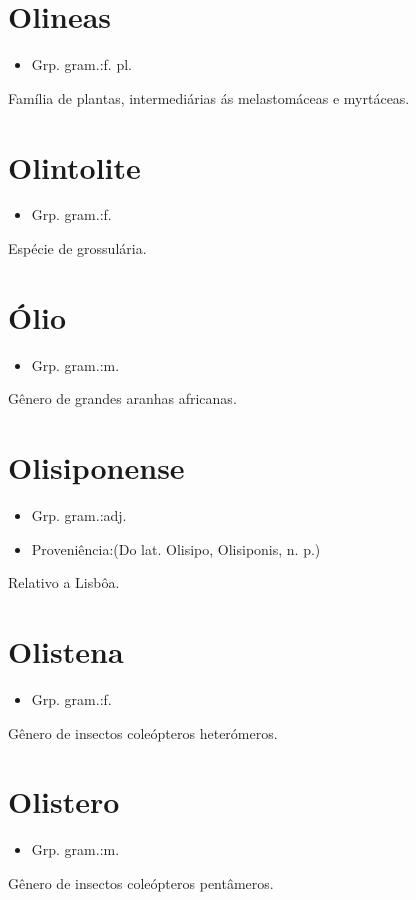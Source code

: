 \section{Olineas}
\begin{itemize}
\item {Grp. gram.:f. pl.}
\end{itemize}
Família de plantas, intermediárias ás melastomáceas e myrtáceas.
\section{Olintolite}
\begin{itemize}
\item {Grp. gram.:f.}
\end{itemize}
Espécie de grossulária.
\section{Ólio}
\begin{itemize}
\item {Grp. gram.:m.}
\end{itemize}
Gênero de grandes aranhas africanas.
\section{Olisiponense}
\begin{itemize}
\item {Grp. gram.:adj.}
\end{itemize}
\begin{itemize}
\item {Proveniência:(Do lat. \textunderscore Olisipo\textunderscore , \textunderscore Olisiponis\textunderscore , n. p.)}
\end{itemize}
Relativo a Lisbôa.
\section{Olistena}
\begin{itemize}
\item {Grp. gram.:f.}
\end{itemize}
Gênero de insectos coleópteros heterómeros.
\section{Olistero}
\begin{itemize}
\item {Grp. gram.:m.}
\end{itemize}
Gênero de insectos coleópteros pentâmeros.
